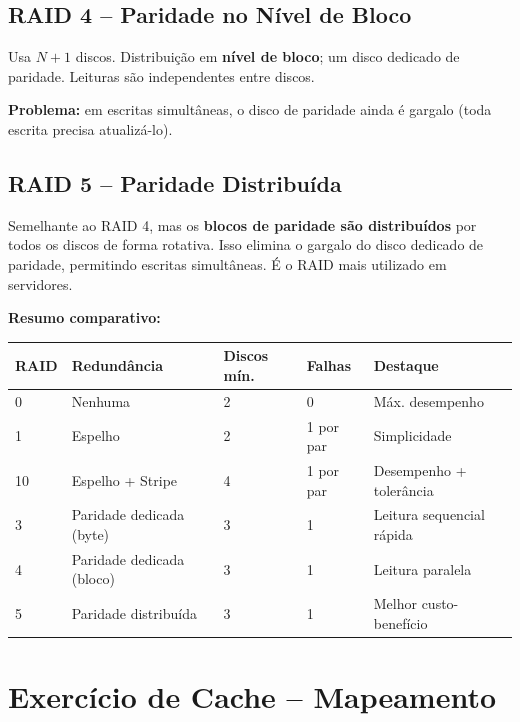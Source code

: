 \documentclass[12pt, a4paper]{article}
\begin{document}
\subsection{RAID 4 -- Paridade no Nível de Bloco}

Usa $N+1$ discos. Distribuição em \textbf{nível de bloco}; um disco dedicado de
paridade. Leituras são independentes entre discos.

\begin{caixaamarela}
  \textbf{Problema:} em escritas simultâneas, o disco de paridade ainda é gargalo
  (toda escrita precisa atualizá-lo).
\end{caixaamarela}

\subsection{RAID 5 -- Paridade Distribuída}

Semelhante ao RAID 4, mas os \textbf{blocos de paridade são distribuídos} por todos os
discos de forma rotativa. Isso elimina o gargalo do disco dedicado de paridade,
permitindo escritas simultâneas. É o RAID mais utilizado em servidores.

\begin{caixaverde}
  \textbf{Resumo comparativo:}
\end{caixaverde}

\vspace{4pt}
\begin{tabular}{llllp{4.5cm}}
  \toprule
  \textbf{RAID} & \textbf{Redundância} & \textbf{Discos mín.} & \textbf{Falhas} & \textbf{Destaque}\\
  \midrule
  0  & Nenhuma                  & 2 & 0             & Máx. desempenho\\
  1  & Espelho                  & 2 & 1 por par     & Simplicidade\\
  10 & Espelho + Stripe         & 4 & 1 por par     & Desempenho + tolerância\\
  3  & Paridade dedicada (byte) & 3 & 1             & Leitura sequencial rápida\\
  4  & Paridade dedicada (bloco)& 3 & 1             & Leitura paralela\\
  5  & Paridade distribuída     & 3 & 1             & Melhor custo-benefício\\
  \bottomrule
\end{tabular}

\section{Exercício de Cache -- Mapeamento}
\end{document}
